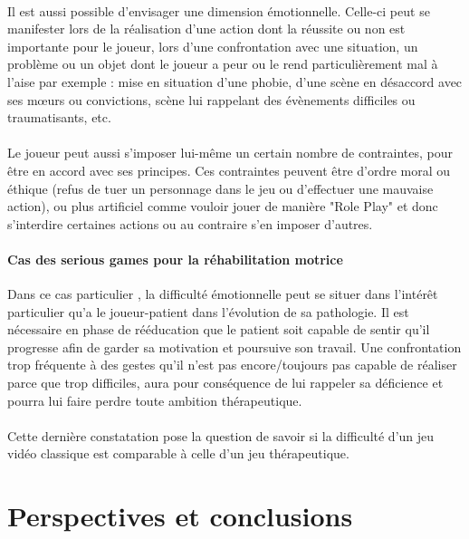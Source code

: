 \documentclass[french, 12pt]{article} %
\begin{document}
\paragraph{}
Il est aussi possible d'envisager une dimension émotionnelle. Celle-ci peut se manifester lors de la réalisation d'une action dont la réussite ou non est importante pour le joueur, lors d'une confrontation avec une situation, un problème ou un objet dont le joueur a peur ou le rend particulièrement mal à l'aise par exemple : mise en situation d'une phobie, d'une scène en désaccord avec ses mœurs ou convictions, scène lui rappelant des évènements difficiles ou traumatisants, etc.

\paragraph{}
Le joueur peut aussi s'imposer lui-même un certain nombre de contraintes, pour être en accord avec ses principes. Ces contraintes peuvent être d'ordre moral ou éthique (refus de tuer un personnage dans le jeu ou d'effectuer une mauvaise action), ou plus artificiel comme vouloir jouer de manière "Role Play" et donc s'interdire certaines actions ou au contraire s'en imposer d'autres.

\paragraph{Cas des serious games pour la réhabilitation motrice\\}
Dans ce cas particulier , la difficulté émotionnelle peut se situer dans l'intérêt particulier qu'a le joueur-patient dans l'évolution de sa pathologie. Il est nécessaire en phase de rééducation que le patient soit capable de sentir qu'il progresse afin de garder sa motivation et poursuive son travail. Une confrontation trop fréquente à des gestes qu'il n'est pas encore/toujours pas capable de réaliser parce que trop difficiles, aura pour conséquence de lui rappeler sa déficience et pourra lui faire perdre toute ambition thérapeutique.

\paragraph{}
Cette dernière constatation pose la question de savoir si la difficulté d'un jeu vidéo classique est comparable à celle d'un jeu thérapeutique.

\section{Perspectives et conclusions}

\newpage
\nocite{*}

\end{document}
